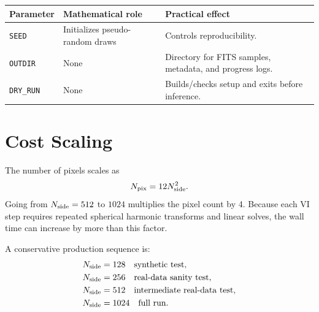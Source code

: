 \documentclass[11pt]{article}
\begin{document}
\begin{center}
\small
\begin{tabularx}{\textwidth}{lXX}
\toprule
Parameter & Mathematical role & Practical effect \\
\midrule
\texttt{SEED}
& Initializes pseudo-random draws
& Controls reproducibility. \\
\texttt{OUTDIR}
& None
& Directory for FITS samples, metadata, and progress logs. \\
\texttt{DRY\_RUN}
& None
& Builds/checks setup and exits before inference. \\
\bottomrule
\end{tabularx}
\end{center}

\section{Cost Scaling}

The number of pixels scales as
\begin{equation}
    N_{\rm pix} = 12N_{\rm side}^2.
\end{equation}
Going from $N_{\rm side}=512$ to $1024$ multiplies the pixel count by 4.
Because each VI step requires repeated spherical harmonic transforms and
linear solves, the wall time can increase by more than this factor.

A conservative production sequence is:
\begin{align*}
    &N_{\rm side}=128 \quad \text{synthetic test},\\
    &N_{\rm side}=256 \quad \text{real-data sanity test},\\
    &N_{\rm side}=512 \quad \text{intermediate real-data test},\\
    &N_{\rm side}=1024 \quad \text{full run}.
\end{align*}
\end{document}
